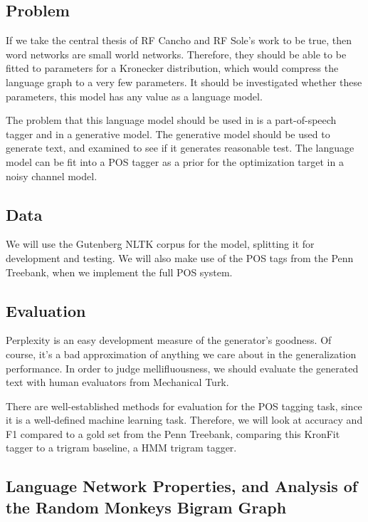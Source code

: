 \documentclass[12pt]{article}
\begin{document}
\subsection{Problem}

If we take the central thesis of RF Cancho and RF Sole's work to be true, then word networks are small world networks. Therefore, they should be able to be fitted to parameters for a Kronecker distribution, which would compress the language graph to a very few parameters. It should be investigated whether these parameters, this model has any value as a language model.

The problem that this language model should be used in is a part-of-speech tagger and in a generative model. The generative model should be used to generate text, and examined to see if it generates reasonable test. The language model can be fit into a POS tagger as a prior for the optimization target in a noisy channel model.\cite{collins}

\subsection{Data}
We will use the Gutenberg NLTK corpus for the model, splitting it for development and testing. We will also make use of the POS tags from the Penn Treebank, when we implement the full POS system. \cite{nltk}


\subsection{Evaluation}
Perplexity is an easy development measure of the generator's goodness. Of course, it's a bad approximation of anything we care about in the generalization performance. In order to judge mellifluousness, we should evaluate the generated text with human evaluators from Mechanical Turk.

There are well-established methods for evaluation for the POS tagging task, since it is a well-defined machine learning task. Therefore, we will look at accuracy and F1 compared to a gold set from the Penn Treebank, comparing this KronFit tagger to a trigram baseline, a HMM trigram tagger.

\subsection{Language Network Properties, and Analysis of the Random Monkeys Bigram Graph}
\end{document}

